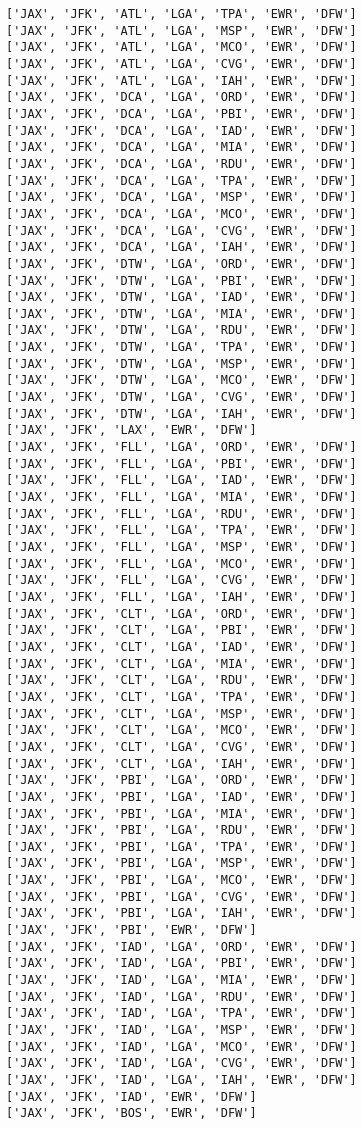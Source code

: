 \documentclass[11pt]{article}
\begin{document}
\begin{Verbatim}[commandchars=\\\{\}]
['JAX', 'JFK', 'ATL', 'LGA', 'TPA', 'EWR', 'DFW']
['JAX', 'JFK', 'ATL', 'LGA', 'MSP', 'EWR', 'DFW']
['JAX', 'JFK', 'ATL', 'LGA', 'MCO', 'EWR', 'DFW']
['JAX', 'JFK', 'ATL', 'LGA', 'CVG', 'EWR', 'DFW']
['JAX', 'JFK', 'ATL', 'LGA', 'IAH', 'EWR', 'DFW']
['JAX', 'JFK', 'DCA', 'LGA', 'ORD', 'EWR', 'DFW']
['JAX', 'JFK', 'DCA', 'LGA', 'PBI', 'EWR', 'DFW']
['JAX', 'JFK', 'DCA', 'LGA', 'IAD', 'EWR', 'DFW']
['JAX', 'JFK', 'DCA', 'LGA', 'MIA', 'EWR', 'DFW']
['JAX', 'JFK', 'DCA', 'LGA', 'RDU', 'EWR', 'DFW']
['JAX', 'JFK', 'DCA', 'LGA', 'TPA', 'EWR', 'DFW']
['JAX', 'JFK', 'DCA', 'LGA', 'MSP', 'EWR', 'DFW']
['JAX', 'JFK', 'DCA', 'LGA', 'MCO', 'EWR', 'DFW']
['JAX', 'JFK', 'DCA', 'LGA', 'CVG', 'EWR', 'DFW']
['JAX', 'JFK', 'DCA', 'LGA', 'IAH', 'EWR', 'DFW']
['JAX', 'JFK', 'DTW', 'LGA', 'ORD', 'EWR', 'DFW']
['JAX', 'JFK', 'DTW', 'LGA', 'PBI', 'EWR', 'DFW']
['JAX', 'JFK', 'DTW', 'LGA', 'IAD', 'EWR', 'DFW']
['JAX', 'JFK', 'DTW', 'LGA', 'MIA', 'EWR', 'DFW']
['JAX', 'JFK', 'DTW', 'LGA', 'RDU', 'EWR', 'DFW']
['JAX', 'JFK', 'DTW', 'LGA', 'TPA', 'EWR', 'DFW']
['JAX', 'JFK', 'DTW', 'LGA', 'MSP', 'EWR', 'DFW']
['JAX', 'JFK', 'DTW', 'LGA', 'MCO', 'EWR', 'DFW']
['JAX', 'JFK', 'DTW', 'LGA', 'CVG', 'EWR', 'DFW']
['JAX', 'JFK', 'DTW', 'LGA', 'IAH', 'EWR', 'DFW']
['JAX', 'JFK', 'LAX', 'EWR', 'DFW']
['JAX', 'JFK', 'FLL', 'LGA', 'ORD', 'EWR', 'DFW']
['JAX', 'JFK', 'FLL', 'LGA', 'PBI', 'EWR', 'DFW']
['JAX', 'JFK', 'FLL', 'LGA', 'IAD', 'EWR', 'DFW']
['JAX', 'JFK', 'FLL', 'LGA', 'MIA', 'EWR', 'DFW']
['JAX', 'JFK', 'FLL', 'LGA', 'RDU', 'EWR', 'DFW']
['JAX', 'JFK', 'FLL', 'LGA', 'TPA', 'EWR', 'DFW']
['JAX', 'JFK', 'FLL', 'LGA', 'MSP', 'EWR', 'DFW']
['JAX', 'JFK', 'FLL', 'LGA', 'MCO', 'EWR', 'DFW']
['JAX', 'JFK', 'FLL', 'LGA', 'CVG', 'EWR', 'DFW']
['JAX', 'JFK', 'FLL', 'LGA', 'IAH', 'EWR', 'DFW']
['JAX', 'JFK', 'CLT', 'LGA', 'ORD', 'EWR', 'DFW']
['JAX', 'JFK', 'CLT', 'LGA', 'PBI', 'EWR', 'DFW']
['JAX', 'JFK', 'CLT', 'LGA', 'IAD', 'EWR', 'DFW']
['JAX', 'JFK', 'CLT', 'LGA', 'MIA', 'EWR', 'DFW']
['JAX', 'JFK', 'CLT', 'LGA', 'RDU', 'EWR', 'DFW']
['JAX', 'JFK', 'CLT', 'LGA', 'TPA', 'EWR', 'DFW']
['JAX', 'JFK', 'CLT', 'LGA', 'MSP', 'EWR', 'DFW']
['JAX', 'JFK', 'CLT', 'LGA', 'MCO', 'EWR', 'DFW']
['JAX', 'JFK', 'CLT', 'LGA', 'CVG', 'EWR', 'DFW']
['JAX', 'JFK', 'CLT', 'LGA', 'IAH', 'EWR', 'DFW']
['JAX', 'JFK', 'PBI', 'LGA', 'ORD', 'EWR', 'DFW']
['JAX', 'JFK', 'PBI', 'LGA', 'IAD', 'EWR', 'DFW']
['JAX', 'JFK', 'PBI', 'LGA', 'MIA', 'EWR', 'DFW']
['JAX', 'JFK', 'PBI', 'LGA', 'RDU', 'EWR', 'DFW']
['JAX', 'JFK', 'PBI', 'LGA', 'TPA', 'EWR', 'DFW']
['JAX', 'JFK', 'PBI', 'LGA', 'MSP', 'EWR', 'DFW']
['JAX', 'JFK', 'PBI', 'LGA', 'MCO', 'EWR', 'DFW']
['JAX', 'JFK', 'PBI', 'LGA', 'CVG', 'EWR', 'DFW']
['JAX', 'JFK', 'PBI', 'LGA', 'IAH', 'EWR', 'DFW']
['JAX', 'JFK', 'PBI', 'EWR', 'DFW']
['JAX', 'JFK', 'IAD', 'LGA', 'ORD', 'EWR', 'DFW']
['JAX', 'JFK', 'IAD', 'LGA', 'PBI', 'EWR', 'DFW']
['JAX', 'JFK', 'IAD', 'LGA', 'MIA', 'EWR', 'DFW']
['JAX', 'JFK', 'IAD', 'LGA', 'RDU', 'EWR', 'DFW']
['JAX', 'JFK', 'IAD', 'LGA', 'TPA', 'EWR', 'DFW']
['JAX', 'JFK', 'IAD', 'LGA', 'MSP', 'EWR', 'DFW']
['JAX', 'JFK', 'IAD', 'LGA', 'MCO', 'EWR', 'DFW']
['JAX', 'JFK', 'IAD', 'LGA', 'CVG', 'EWR', 'DFW']
['JAX', 'JFK', 'IAD', 'LGA', 'IAH', 'EWR', 'DFW']
['JAX', 'JFK', 'IAD', 'EWR', 'DFW']
['JAX', 'JFK', 'BOS', 'EWR', 'DFW']


\end{Verbatim}
\end{document}
